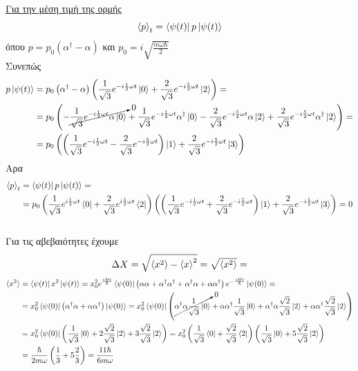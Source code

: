 \documentclass[12pt]{article}
\begin{document}
\underline{Για την μέση τιμή της ορμής} \\
$$\braket{p}_t = \bra{\psi(t)}p \ket{\psi(t)} $$
όπου $p = p_0(\alpha^\dag-\alpha)$ και $p_0 = i\sqrt{\frac{m\omega\hbar}{2}}$ \\
Συνεπώς 
\begin{align*}
    p\ket{\psi(t)} &= p_0\left(\alpha^\dag -\alpha \right)\left(\frac{1}{\sqrt{3}}e^{-i\frac{1}{2}\omega t}\ket{0}+\frac{2}{\sqrt{3}}e^{-i\frac{5}{2}\omega t}\ket{2}\right) =  \\
    &=p_0\left(-\cancelto{0}{\frac{1}{\sqrt{3}}e^{-i\frac{1}{2}\omega t}\alpha\ket{0}} + \frac{1}{\sqrt{3}}e^{-i\frac{1}{2}\omega t}\alpha^\dag\ket{0}-\frac{2}{\sqrt{3}}e^{-i\frac{5}{2}\omega t}\alpha\ket{2}+\frac{2}{\sqrt{3}}e^{-i\frac{5}{2}\omega t}\alpha^\dag\ket{2}\right)=\\
    &= p_0\left(\left(\frac{1}{\sqrt{3}}e^{-i\frac{1}{2}\omega t}-\frac{2}{\sqrt{3}}e^{-i\frac{5}{2}\omega t}\right)\ket{1} + \frac{2}{\sqrt{3}}e^{-i\frac{5}{2}\omega t}\ket{3}\right)
\end{align*}
Αρα 
\begin{align*}
    \braket{p}_t &= \bra{\psi(t)}p\ket{\psi(t)} =\\
    &= p_0\left(\frac{1}{\sqrt{3}}e^{i\frac{1}{2}\omega t}\bra{0}+\frac{2}{\sqrt{3}}e^{i\frac{5}{2}\omega t}\bra{2}\right)\left(\left(\frac{1}{\sqrt{3}}e^{-i\frac{1}{2}\omega t}+\frac{2}{\sqrt{3}}e^{-i\frac{5}{2}\omega t}\right)\ket{1} + \frac{2}{\sqrt{3}}e^{-i\frac{5}{2}\omega t}\ket{3}\right)=0   
\end{align*}\\
Για τις αβεβαιότητες έχουμε
\begin{align*}
    \Delta X = \sqrt{\braket{x^2}- \braket{x}^2} = \sqrt{\braket{x^2}} = 
\end{align*}
\begin{align*}
    \braket{x^2} &= \bra{\psi(t)}x^2\ket{\psi(t)} = x_0^2 e^{\frac{iHt}{\hbar}}\bra{\psi(0)}\left(\alpha \alpha +\alpha^\dag\alpha^\dag + \alpha^\dag \alpha +\alpha \alpha^\dag\right)e^{-\frac{iHt}{\hbar}}\ket{\psi(0)} = \\
    &=x_0^2 \bra{\psi(0)}\left( \alpha^\dag \alpha +\alpha \alpha^\dag\right)\ket{\psi(0)} = x_0^2\bra{\psi(0)}\left(\cancelto{0}{\alpha^\dag \alpha\frac{1}{\sqrt{3}}\ket{0}}+\alpha \alpha^\dag\frac{1}{\sqrt{3}}\ket{0} +\alpha^\dag \alpha\frac{\sqrt{2}}{\sqrt{3}}\ket{2}+\alpha \alpha^\dag\frac{\sqrt{2}}{\sqrt{3}}\ket{2} \right)\\
    &=x_0^2\bra{\psi(0)}\left(\frac{1}{\sqrt{3}}\ket{0} +2\frac{\sqrt{2}}{\sqrt{3}}\ket{2}+3\frac{\sqrt{2}}{\sqrt{3}}\ket{2} \right) = x_0^2\left(\frac{1}{\sqrt{3}}\bra{0} +\frac{\sqrt{2}}{\sqrt{3}}\bra{2} \right)\left(\frac{1}{\sqrt{3}}\ket{0} +5\frac{\sqrt{2}}{\sqrt{3}}\ket{2} \right)\\
    &=\frac{\hbar}{2m\omega}\left(\frac{1}{3}+ 5\frac{2}{3}\right) = \frac{11\hbar}{6m\omega}
\end{align*}
\end{document}

